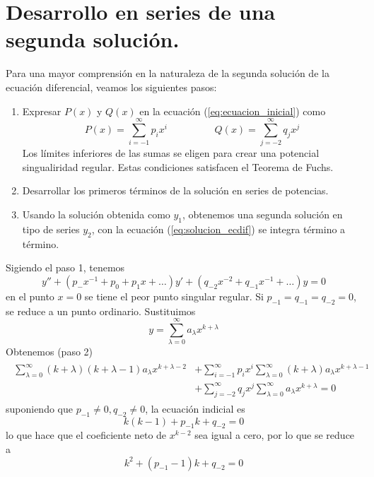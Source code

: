 \section{Desarrollo en series de una segunda solución.}
Para una mayor comprensión en la naturaleza de la segunda solución de la ecuación diferencial, veamos los siguientes pasos:
\begin{enumerate}
\item Expresar $P(x)$ y $Q(x)$ en la ecuación (\ref{eq:ecuacion_inicial}) como
\begin{equation}
P(x) = \sum_{i=-1}^{\infty} p_{i}x^{i} \hspace{2cm} Q(x) = \sum_{j=-2}^{\infty} q_{j} x^{j}
\end{equation}
Los límites inferiores de las sumas se eligen para crear una potencial singualiridad regular. Estas condiciones satisfacen el Teorema de Fuchs.
\item Desarrollar los primeros términos de la solución en series de potencias.
\item Usando la solución obtenida como $y_{1}$, obtenemos una segunda solución en tipo de series $y_{2}$, con la ecuación (\ref{eq:solucion_ecdif}) se integra término a término.
\end{enumerate}
Sigiendo el paso 1, tenemos
\begin{equation}
y'' + (p_{-} x^{-1} + p_{0} + p_{1} x + \ldots) y' + (q_{-2} x^{-2} + q_{-1} x^{-1} + \ldots) y = 0
\end{equation}
en el punto $x=0$ se tiene el peor punto singular regular. Si $p_{-1} = q_{-1} = q_{-2} =0$, se reduce a un punto ordinario. Sustituimos
\[ y = \sum_{\lambda=0}^{\infty} a_{\lambda} x^{k + \lambda} \]
Obtenemos (paso 2)
\begin{eqnarray}
\begin{aligned}
\sum_{\lambda=0}^{\infty} (k + \lambda)(k + \lambda -1) a_{\lambda} x^{k + \lambda -2} &+ \sum_{i=-1}^{\infty} p_{i} x^{i} \sum_{\lambda=0}^{\infty} (k + \lambda) a_{\lambda} x^{k + \lambda -1} \\
&+ \sum_{j=-2}^{\infty} q_{j} x^{j} \sum_{\lambda=0}^{\infty} a_{\lambda} x^{k + \lambda} = 0
\end{aligned}
\end{eqnarray}
suponiendo que $p_{-1} \neq 0, q_{-2} \neq 0$, la ecuación indicial es
\[ k(k-1) + p_{-1} k + q_{-2} = 0 \]
lo que hace que el coeficiente neto de $x^{k-2}$ sea igual a cero, por lo que se reduce a
\begin{equation}
k^{2} + (p_{-1} - 1) k + q_{-2} = 0
\end{equation}
